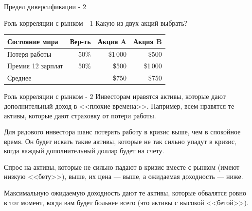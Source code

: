 \documentclass{beamer}
\newcommand{\qrcodeminipage}[1]{
	\begin{minipage}{0.3\textwidth}
		\qrcode[height=\textwidth]{#1}
	\end{minipage}
}
\begin{document}
\begin{frame}{Предел диверсификации - 2}
\centering
{}
\end{frame}



\begin{frame}{Роль корреляции с рынком - 1}
\justify
Какую из двух акций выбрать?

\justify
\centering
\begin{tabular}{l|r|r|r}
Состояние мира    & Вер-ть & Акция A  & Акция B \\ \hline
Потеря работы     & 50\%   & \$1\,000 & \$500 \\
Премия 12 зарплат & 50\%   & \$500    & \$1\,000 \\ \hline
Среднее           &        & \$750    & \$750
\end{tabular}

\justify
\centering
\qrcodeminipage{https://www.menti.com/ou76f57662}
\end{frame}



\begin{frame}{Роль корреляции с рынком - 2}
\justify
Инвесторам нравятся активы, которые дают дополнительный доход в <<плохие 
времена>>. Например, всем нравятся те активы, которые дают страховку от потери
работы.

\justify
Для рядового инвестора шанс потерять работу в кризис выше, чем в спокойное 
время. Он будет искать такие активы, которые не так сильно упадут в кризис, 
когда каждый дополнительный доллар будет на счету.

\justify
Спрос на активы, которые не сильно падают в кризис вместе с рынком (имеют 
низкую <<бету>>), выше, их цена --- выше, а ожидаемая доходность --- ниже.

\justify
Максимальную ожидаемую доходность дают те активы, которые обвалятся ровно в тот
момент, когда вам будет больнее всего (это активы с высокой <<бетой>>).
\end{frame}
\end{document}
